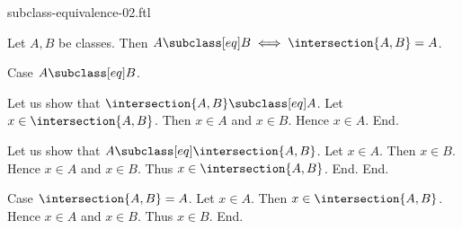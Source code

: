 \documentclass{article}
\begin{document}
\begin{smodule}[creators={Marcel Schütz}]{subclass-equivalence-02.ftl}

  \begin{fproposition*}[label=4268206566932480]
    Let $A, B$ be classes.
    Then $A \subclass[eq] B \iff \intersection{A,B} = A$.
  \end{fproposition*}
  \begin{fproof}
    Case $A \subclass[eq] B$.

      Let us show that $\intersection{A,B} \subclass[eq] A$.
        Let $x \in \intersection{A,B}$.
        Then $x \in A$ and $x \in B$.
        Hence $x \in A$.
      End.

      Let us show that $A \subclass[eq] \intersection{A,B}$.
        Let $x \in A$.
        Then $x \in B$.
        Hence $x \in A$ and $x \in B$.
        Thus $x \in \intersection{A,B}$.
      End.
    End.

    Case $\intersection{A,B} = A$.
      Let $x \in A$.
      Then $x \in \intersection{A,B}$.
      Hence $x \in A$ and $x \in B$.
      Thus $x \in B$.
    End.
  \end{fproof}
\end{smodule}
\end{document}
